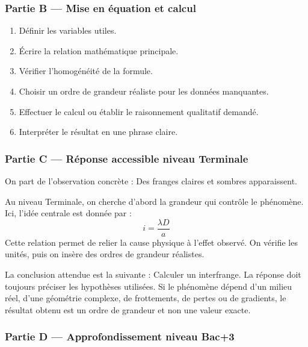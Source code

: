 \documentclass[11pt,a4paper]{article}
\begin{document}
\subsubsection*{Partie B — Mise en équation et calcul}

\begin{enumerate}
  \item Définir les variables utiles.
  \item Écrire la relation mathématique principale.
  \item Vérifier l'homogénéité de la formule.
  \item Choisir un ordre de grandeur réaliste pour les données manquantes.
  \item Effectuer le calcul ou établir le raisonnement qualitatif demandé.
  \item Interpréter le résultat en une phrase claire.
\end{enumerate}

\subsubsection*{Partie C — Réponse accessible niveau Terminale}

\begin{corrigebox}
On part de l'observation concrète : Des franges claires et sombres apparaissent.

Au niveau Terminale, on cherche d'abord la grandeur qui contrôle le phénomène. Ici, l'idée centrale est donnée par :
\[
i=\frac{\lambda D}{a}
\]
Cette relation permet de relier la cause physique à l'effet observé. On vérifie les unités, puis on insère des ordres de grandeur réalistes.

La conclusion attendue est la suivante : Calculer un interfrange. La réponse doit toujours préciser les hypothèses utilisées. Si le phénomène dépend d'un milieu réel, d'une géométrie complexe, de frottements, de pertes ou de gradients, le résultat obtenu est un ordre de grandeur et non une valeur exacte.
\end{corrigebox}

\subsubsection*{Partie D — Approfondissement niveau Bac+3}
\end{document}
